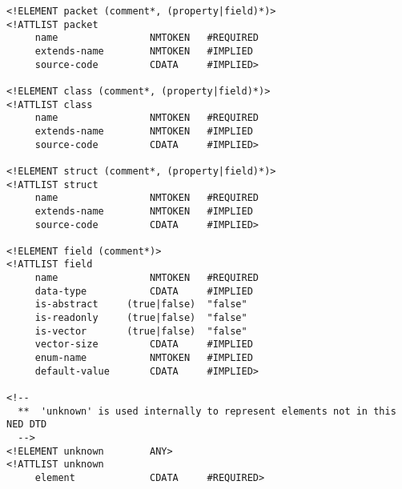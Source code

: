 \begin{verbatim}
<!ELEMENT packet (comment*, (property|field)*)>
<!ATTLIST packet
     name                NMTOKEN   #REQUIRED
     extends-name        NMTOKEN   #IMPLIED
     source-code         CDATA     #IMPLIED>

<!ELEMENT class (comment*, (property|field)*)>
<!ATTLIST class
     name                NMTOKEN   #REQUIRED
     extends-name        NMTOKEN   #IMPLIED
     source-code         CDATA     #IMPLIED>

<!ELEMENT struct (comment*, (property|field)*)>
<!ATTLIST struct
     name                NMTOKEN   #REQUIRED
     extends-name        NMTOKEN   #IMPLIED
     source-code         CDATA     #IMPLIED>

<!ELEMENT field (comment*)>
<!ATTLIST field
     name                NMTOKEN   #REQUIRED
     data-type           CDATA     #IMPLIED
     is-abstract     (true|false)  "false"
     is-readonly     (true|false)  "false"
     is-vector       (true|false)  "false"
     vector-size         CDATA     #IMPLIED
     enum-name           NMTOKEN   #IMPLIED
     default-value       CDATA     #IMPLIED>

<!--
  **  'unknown' is used internally to represent elements not in this NED DTD
  -->
<!ELEMENT unknown        ANY>
<!ATTLIST unknown
     element             CDATA     #REQUIRED>
\end{verbatim}



